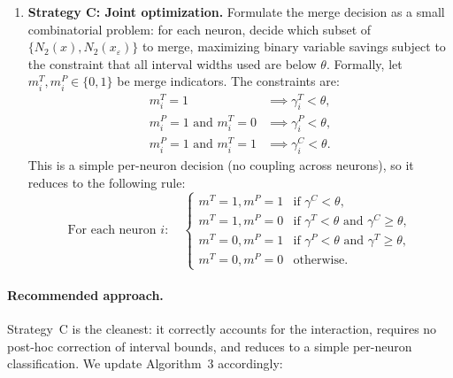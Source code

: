 \documentclass[11pt]{article}
\begin{document}
\begin{enumerate}
\item \textbf{Strategy C: Joint optimization.}
Formulate the merge decision as a small combinatorial problem: for each
neuron, decide which subset of $\{N_2(x), N_2(x_\varepsilon)\}$ to merge,
maximizing binary variable savings subject to the constraint that all
interval widths used are below $\theta$. Formally, let $m^T_i, m^P_i \in \{0,1\}$
be merge indicators. The constraints are:
\begin{align}
    m^T_i = 1 &\implies \gamma^T_i < \theta, \\
    m^P_i = 1 \text{ and } m^T_i = 0 &\implies \gamma^P_i < \theta, \\
    m^P_i = 1 \text{ and } m^T_i = 1 &\implies \gamma^C_i < \theta.
\end{align}
This is a simple per-neuron decision (no coupling across neurons), so it
reduces to the following rule:
\[
\text{For each neuron } i: \quad
\begin{cases}
    m^T = 1, m^P = 1 & \text{if } \gamma^C < \theta, \\
    m^T = 1, m^P = 0 & \text{if } \gamma^T < \theta \text{ and } \gamma^C \ge \theta, \\
    m^T = 0, m^P = 1 & \text{if } \gamma^P < \theta \text{ and } \gamma^T \ge \theta, \\
    m^T = 0, m^P = 0 & \text{otherwise.}
\end{cases}
\]
\end{enumerate}

\paragraph{Recommended approach.}
Strategy~C is the cleanest: it correctly accounts for the interaction,
requires no post-hoc correction of interval bounds, and reduces to a
simple per-neuron classification. We update Algorithm~3 accordingly:
\end{document}
